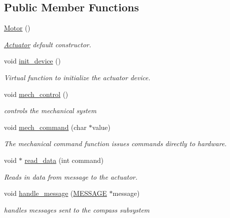 \subsection*{Public Member Functions}
\begin{DoxyCompactItemize}
\item 
\hyperlink{classMotor_af6106b4c506411265c5face762b6c004}{Motor} ()
\begin{DoxyCompactList}\small\item\em \hyperlink{classActuator}{Actuator} default constructor. \end{DoxyCompactList}\item 
void \hyperlink{classMotor_a861cd4da09dd25fc02d711a34f25a988}{init\-\_\-device} ()
\begin{DoxyCompactList}\small\item\em Virtual function to initialize the actuator device. \end{DoxyCompactList}\item 
\hypertarget{classMotor_a9902b2c030a06ca8a4e2f10c3530dbec}{void \hyperlink{classMotor_a9902b2c030a06ca8a4e2f10c3530dbec}{mech\-\_\-control} ()}\label{classMotor_a9902b2c030a06ca8a4e2f10c3530dbec}

\begin{DoxyCompactList}\small\item\em controls the mechanical system \end{DoxyCompactList}\item 
void \hyperlink{classMotor_a3edca1dcb0f3df55eccc09ffb14426a4}{mech\-\_\-command} (char $\ast$value)
\begin{DoxyCompactList}\small\item\em The mechanical command function issues commands directly to hardware. \end{DoxyCompactList}\item 
void $\ast$ \hyperlink{classMotor_a1727e2d2dfd483c9c85824915a6aeeb8}{read\-\_\-data} (int command)
\begin{DoxyCompactList}\small\item\em Reads in data from message to the actuator. \end{DoxyCompactList}\item 
\hypertarget{classMotor_add07c258d9b239633a3882a07dc9e4de}{void \hyperlink{classMotor_add07c258d9b239633a3882a07dc9e4de}{handle\-\_\-message} (\hyperlink{SUBSYS__COMMANDS_8h_ad814416fc1a8c675bea2687d96088a8f}{M\-E\-S\-S\-A\-G\-E} $\ast$message)}\label{classMotor_add07c258d9b239633a3882a07dc9e4de}

\begin{DoxyCompactList}\small\item\em handles messages sent to the compass subsystem \end{DoxyCompactList}\end{DoxyCompactItemize}
